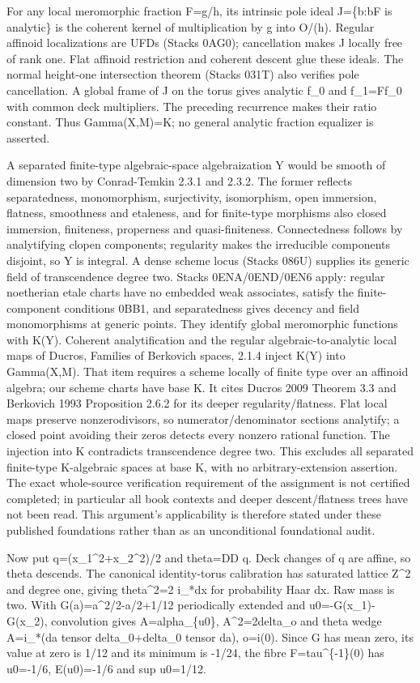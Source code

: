 \documentclass[11pt]{article}
\begin{document}
For any local meromorphic fraction F=g/h, its intrinsic pole ideal J=\{b:bF is analytic\} is the coherent kernel of multiplication by g into O/(h). Regular affinoid localizations are UFDs (Stacks 0AG0); cancellation makes J locally free of rank one. Flat affinoid restriction and coherent descent glue these ideals. The normal height-one intersection theorem (Stacks 031T) also verifies pole cancellation. A global frame of J on the torus gives analytic f\_0 and f\_1=Ff\_0 with common deck multipliers. The preceding recurrence makes their ratio constant. Thus Gamma(X,M)=K; no general analytic fraction equalizer is asserted.

A separated finite-type algebraic-space algebraization Y would be smooth of dimension two by Conrad-Temkin 2.3.1 and 2.3.2. The former reflects separatedness, monomorphism, surjectivity, isomorphism, open immersion, flatness, smoothness and etaleness, and for finite-type morphisms also closed immersion, finiteness, properness and quasi-finiteness. Connectedness follows by analytifying clopen components; regularity makes the irreducible components disjoint, so Y is integral. A dense scheme locus (Stacks 086U) supplies its generic field of transcendence degree two. Stacks 0ENA/0END/0EN6 apply: regular noetherian etale charts have no embedded weak associates, satisfy the finite-component conditions 0BB1, and separatedness gives decency and field monomorphisms at generic points. They identify global meromorphic functions with K(Y). Coherent analytification and the regular algebraic-to-analytic local maps of Ducros, Families of Berkovich spaces, 2.1.4 inject K(Y) into Gamma(X,M). That item requires a scheme locally of finite type over an affinoid algebra; our scheme charts have base K. It cites Ducros 2009 Theorem 3.3 and Berkovich 1993 Proposition 2.6.2 for its deeper regularity/flatness. Flat local maps preserve nonzerodivisors, so numerator/denominator sections analytify; a closed point avoiding their zeros detects every nonzero rational function. The injection into K contradicts transcendence degree two. This excludes all separated finite-type K-algebraic spaces at base K, with no arbitrary-extension assertion. The exact whole-source verification requirement of the assignment is not certified completed; in particular all book contexts and deeper descent/flatness trees have not been read. This argument's applicability is therefore stated under these published foundations rather than as an unconditional foundational audit.

Now put q=(x\_1\textasciicircum{}2+x\_2\textasciicircum{}2)/2 and theta=DD q. Deck changes of q are affine, so theta descends. The canonical identity-torus calibration has saturated lattice Z\textasciicircum{}2 and degree one, giving theta\textasciicircum{}2=2 i\_*dx for probability Haar dx. Raw mass is two. With G(a)=a\textasciicircum{}2/2-a/2+1/12 periodically extended and u0=-G(x\_1)-G(x\_2), convolution gives A=alpha\_\{u0\}, A\textasciicircum{}2=2delta\_o and theta wedge A=i\_*(da tensor delta\_0+delta\_0 tensor da), o=i(0). Since G has mean zero, its value at zero is 1/12 and its minimum is -1/24, the fibre F=tau\textasciicircum{}\{-1\}(0) has u0=-1/6, E(u0)=-1/6 and sup u0=1/12.
\end{document}
